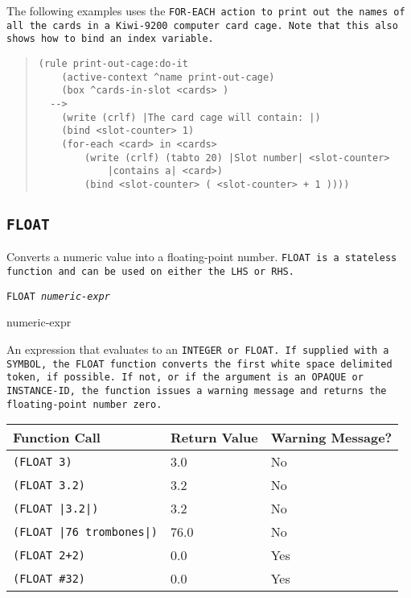 \Example

The following examples uses the \tt{FOR-EACH} action to print out the
names of all the cards in a Kiwi-9200 computer card cage.  Note that
this also shows how to bind an index variable.

\begin{quote}
\begin{verbatim}
(rule print-out-cage:do-it
    (active-context ^name print-out-cage)
    (box ^cards-in-slot <cards> )
  -->
    (write (crlf) |The card cage will contain: |)
    (bind <slot-counter> 1)
    (for-each <card> in <cards>
        (write (crlf) (tabto 20) |Slot number| <slot-counter>
            |contains a| <card>)
        (bind <slot-counter> ( <slot-counter> + 1 ))))
\end{verbatim}
\end{quote}

\subsection{\tt{FLOAT}}

Converts a numeric value into a floating-point number. \tt{FLOAT} is a
stateless function and can be used on either the LHS or RHS.

\Format

\tt{FLOAT} \it{numeric-expr}

\begin{arguments}
\item[numeric-expr]

  An expression that evaluates to an \tt{INTEGER} or \tt{FLOAT}. If
  supplied with a \tt{SYMBOL}, the \tt{FLOAT} function converts the
  first white space delimited token, if possible. If not, or if the
  argument is an \tt{OPAQUE} or \tt{INSTANCE-ID}, the function issues
  a warning message and returns the floating-point number zero.
\end{arguments}

\begin{center}
  \begin{tabular}{lll}
    \toprule
    Function Call & Return Value &  Warning Message? \\
    \midrule
    \verb,(FLOAT 3), & 3.0  & No \\
    \verb,(FLOAT 3.2), &  3.2 & No \\
    \verb,(FLOAT |3.2|), &  3.2 & No \\
    \verb,(FLOAT |76 trombones|), & 76.0 &  No \\
    \verb,(FLOAT 2+2), & 0.0 & Yes \\
    \verb,(FLOAT #32), &  0.0 &  Yes \\
    \bottomrule
  \end{tabular}
\end{center}

